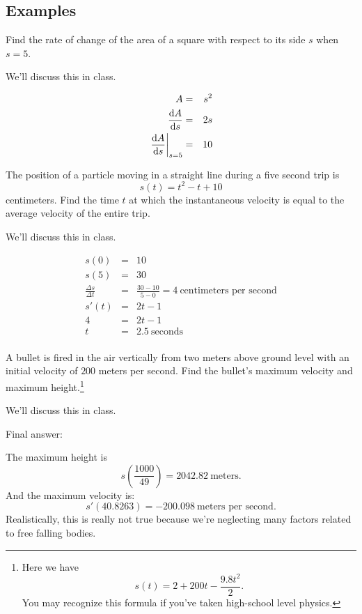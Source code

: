 \documentclass[12pt,addpoints, answers, fleqn]{exam}
\begin{document}
\subsection{Examples}
\begin{questions}
\question Find the rate of change of  the area of a square with respect to its side $s$ when $s=5$.
\begin{solution}
We'll discuss this in class.

\begin{eqnarray*}
A &=& s^2\\
\frac{{\rm{d}}A}{{\rm{d}}s} &=& 2s\\
\left. \frac{{\rm{d}}A}{{\rm{d}}s} \right|_{s=5}&=& 10\\
\end{eqnarray*}

\end{solution}


\question The position of a particle moving in a straight line during a five second trip is
\[
s\left(t\right) = t^2-t+10
\] centimeters. Find the time $t$ at which the instantaneous velocity is equal to the average velocity of the entire trip. 
\begin{solution}
We'll discuss this in class.

\begin{eqnarray*}
s\left(0\right) &=& 10\\
s\left(5\right) &=& 30\\
\frac{\Delta s}{\Delta t} &=& \frac{30 - 10}{5 - 0} = 4 \ \mbox{centimeters per second}\\
s' \left(t\right) &=& 2t-1\\
4 &=& 2t-1\\
t&=&2.5 \ \mbox{seconds}\\
\end{eqnarray*}

\end{solution}


\question A bullet is fired in the air vertically from two meters above ground level with an initial velocity of $200$ meters per second. Find the bullet's maximum velocity and maximum height.\footnote{Here we have
\[
s\left( t \right) = 2 + 200 t - \frac{9.8t^2}{2}.
\] You may recognize this formula if you've taken high-school level physics.}
\begin{solution}
We'll discuss this in class.

Final answer:

The maximum height is
\[
s\left( \frac{1000}{49} \right) = 2042.82 \ \mbox{meters}.
\]
And the maximum velocity is:
\[
s'\left( 40.8263  \right) = -200.098 \ \mbox{meters per second}.
\]
Realistically, this is really not true because we're neglecting many factors related to free falling bodies.
\end{solution}


\end{questions}
\end{document}
